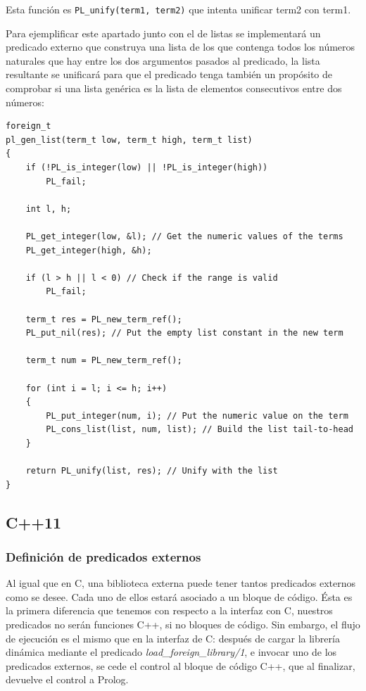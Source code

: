 \documentclass[a4paper]{article}
\begin{document}
Esta función es \texttt{PL\_unify(term1, term2)} que intenta unificar term2 con term1.

Para ejemplificar este apartado junto con el de listas se implementará un predicado externo que construya una lista de los que contenga todos los números naturales que hay entre los dos argumentos pasados al predicado, la lista resultante se unificará para que el predicado tenga también un propósito de comprobar si una lista genérica es la lista de elementos consecutivos entre dos números:

\begin{lstlisting}[style=C++]
foreign_t
pl_gen_list(term_t low, term_t high, term_t list)
{
	if (!PL_is_integer(low) || !PL_is_integer(high))
		PL_fail;
	
	int l, h;
	
	PL_get_integer(low, &l); // Get the numeric values of the terms
	PL_get_integer(high, &h);
	
	if (l > h || l < 0) // Check if the range is valid
		PL_fail;
	
	term_t res = PL_new_term_ref();
	PL_put_nil(res); // Put the empty list constant in the new term
	
	term_t num = PL_new_term_ref();
	
	for (int i = l; i <= h; i++)
	{
		PL_put_integer(num, i); // Put the numeric value on the term
		PL_cons_list(list, num, list); // Build the list tail-to-head
	}
	
	return PL_unify(list, res); // Unify with the list
}
\end{lstlisting}

\subsection{C++11}
\subsubsection{Definición de predicados externos}
Al igual que en C, una biblioteca externa puede tener tantos predicados externos como se desee. Cada uno de ellos estará asociado a un bloque de código. Ésta es la primera diferencia que tenemos con respecto a la interfaz con C, nuestros predicados no serán funciones C++, si no bloques de código. Sin embargo, el flujo de ejecución es el mismo que en la interfaz de C: después de cargar la librería dinámica mediante el predicado \textit{load\_foreign\_library/1}, e invocar uno de los predicados externos, se cede el control al bloque de código C++, que al finalizar, devuelve el control a Prolog.
\end{document}
